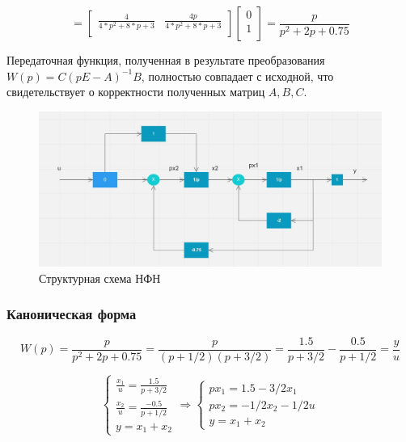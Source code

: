 \documentclass[14pt,a4paper,report]{report}
\begin{document}
\begin{equation*}
\text{$=\begin{bmatrix}
\frac{4}{4*p^2 + 8*p + 3} & \frac{4p}{4*p^2 + 8*p + 3} \\
\end{bmatrix}\begin{bmatrix}
0 \\
1 \\
\end{bmatrix}=\frac{p}{p^2+2p+0.75}
$}
\end{equation*}

Передаточная функция, полученная в результате преобразования $W(p)=C(pE-A)^{-1}B$, полностью совпадает с исходной, что свидетельствует о корректности полученных матриц  $A, B, C$. 

\clearpage

\begin{figure}[h!]
	\centering
	\includegraphics[scale = 0.67]{images/nfn.jpg}
	\caption{Структурная схема НФН}
	\label{image:2}
\end{figure}

\subsubsection{Каноническая форма}

\begin{equation*}
\text{$W(p)=\frac{p}{p^2+2p+0.75}=\frac{p}{(p+1/2)(p+3/2)}=\frac{1.5}{p+3/2}-\frac{0.5}{p+1/2}=\frac{y}{u}$}
\end{equation*}

\begin{equation*}
\begin{cases}
	\text{$\frac{x_1}{u}=\frac{1.5}{p+3/2}$} \\
	\text{$\frac{x_2}{u}=\frac{-0.5}{p+1/2}$} \\
	\text{$y=x_1+x_2$}
\end{cases}
\Longrightarrow
\begin{cases}
\text{$px_1=1.5-3/2x_1$} \\
\text{$px_2=-1/2x_2-1/2u$} \\
\text{$y=x_1+x_2$}
\end{cases}
\end{equation*}
\end{document}
